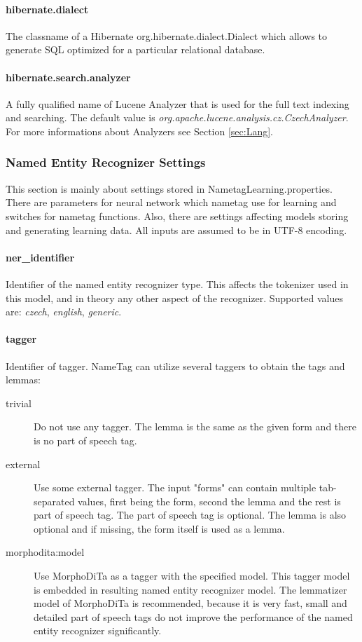 \paragraph{hibernate.dialect}
The classname of a Hibernate org.hibernate.dialect.Dialect which allows to generate
SQL optimized for a particular relational database.

\paragraph{hibernate.search.analyzer}
A fully qualified name of Lucene Analyzer that is used for the full text indexing
and searching. The default value is \emph{org.\-apache.\-lucene.\-analysis.\-cz.\-CzechAnalyzer}.
For more informations about Analyzers see Section \ref{sec:Lang}.

\subsubsection{Named Entity Recognizer Settings}
\label{sssec:NametagSettings}
This section is mainly about settings stored in NametagLearning.properties. There
are parameters for neural network which nametag use for learning and switches for
nametag functions. Also, there are settings affecting models storing and
generating learning data. All inputs are assumed to be in UTF-8 encoding.

\paragraph{ner\_identifier}
Identifier of the named entity recognizer type. This affects the tokenizer used
in this model, and in theory any other aspect of the recognizer. Supported values
are: \emph{czech}, \emph{english}, \emph{generic}.

\paragraph{tagger}
Identifier of tagger. NameTag can utilize several taggers to obtain the tags and lemmas:

\begin{description}
\item[trivial]
Do not use any tagger. The lemma is the same as the given form and there is no
part of speech tag.
\item[external]
Use some external tagger. The input "forms" can contain multiple tab-separated
values, first being the form, second the lemma and the rest is part of speech tag.
The part of speech tag is optional. The lemma is also optional and if missing,
the form itself is used as a lemma.
\item[morphodita:model]
Use MorphoDiTa as a tagger with the specified model. This tagger model is embedded
in resulting named entity recognizer model. The lemmatizer model of MorphoDiTa
is recommended, because it is very fast, small and detailed part of speech tags
do not improve the performance of the named entity recognizer significantly.
\end{description}


